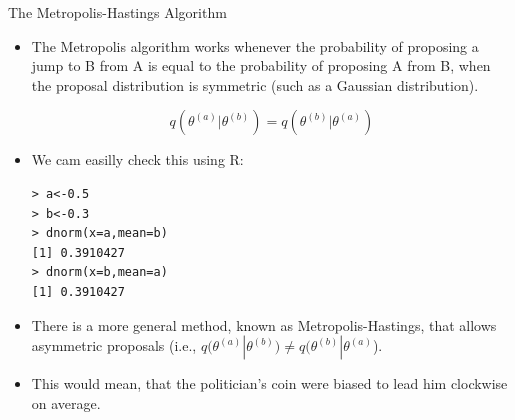 \documentclass[handout]{beamer}
\begin{document}
\begin{frame}[fragile]{The Metropolis-Hastings Algorithm}
\scriptsize{

\begin{itemize}

\item The Metropolis algorithm works whenever the probability of proposing a jump to B from A is equal to the probability of proposing A from B, when the proposal distribution is symmetric (such as a Gaussian distribution).

\begin{displaymath}
q(\theta^{(a)}|\theta^{(b)}) =  q(\theta^{(b)}|\theta^{(a)})
\end{displaymath}

\item We cam easilly check this using R:

\begin{verbatim}
> a<-0.5
> b<-0.3
> dnorm(x=a,mean=b)
[1] 0.3910427
> dnorm(x=b,mean=a)
[1] 0.3910427
\end{verbatim}



\item There is a more general method, known as Metropolis-Hastings, that allows asymmetric proposals (i.e., $q(\theta^{(a)}|\theta^{(b)}) \neq  q(\theta^{(b)}|\theta^{(a)}$).

\item This would mean, that the politician's coin were biased to lead him clockwise on average.


\end{itemize}


} 
\end{frame}
\end{document}
